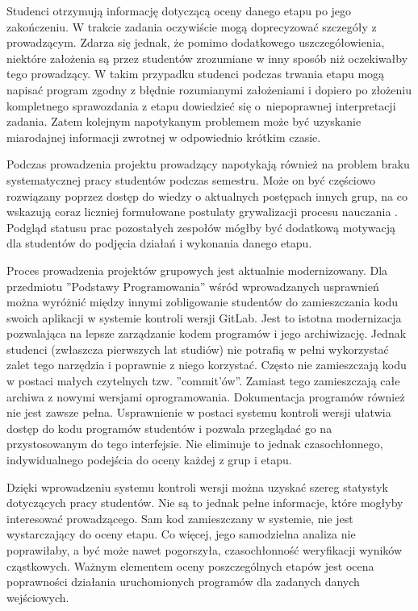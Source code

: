 Studenci otrzymują informację dotyczącą oceny danego etapu po jego zakończeniu.
W trakcie zadania oczywiście mogą doprecyzować szczegóły z prowadzącym.
Zdarza się jednak, że pomimo dodatkowego uszczegółowienia, niektóre założenia są przez studentów zrozumiane w inny sposób niż oczekiwałby tego prowadzący.
W takim przypadku studenci podczas trwania etapu mogą napisać program zgodny z błędnie rozumianymi założeniami i dopiero po złożeniu kompletnego sprawozdania z etapu dowiedzieć się o~niepoprawnej interpretacji zadania.
Zatem kolejnym napotykanym problemem może być uzyskanie miarodajnej informacji zwrotnej w odpowiednio krótkim czasie.

Podczas prowadzenia projektu prowadzący napotykają również na problem braku systematycznej pracy studentów podczas semestru.
Może on być częściowo rozwiązany poprzez dostęp do wiedzy o aktualnych postępach innych grup, na co wskazują coraz liczniej formułowane postulaty grywalizacji procesu nauczania \cite{gamification}.
Podgląd statusu prac pozostałych zespołów mógłby być dodatkową motywacją dla studentów do podjęcia działań i wykonania danego etapu.

Proces prowadzenia projektów grupowych jest aktualnie modernizowany.
Dla przedmiotu ”Podstawy Programowania” wśród wprowadzanych usprawnień można wyróżnić między innymi zobligowanie studentów do zamieszczania kodu swoich aplikacji w systemie kontroli wersji GitLab.
Jest to istotna modernizacja pozwalająca na lepsze zarządzanie kodem programów i jego archiwizację.
Jednak studenci (zwłaszcza pierwszych lat studiów) nie potrafią w pełni wykorzystać zalet tego narzędzia i poprawnie z niego korzystać.
Często nie zamieszczają kodu w postaci małych czytelnych tzw. ”commit'ów”.
Zamiast tego zamieszczają całe archiwa z nowymi wersjami oprogramowania.
Dokumentacja programów również nie jest zawsze pełna.
Usprawnienie w postaci systemu kontroli wersji ułatwia dostęp do kodu programów studentów i pozwala przeglądać go na przystosowanym do tego interfejsie.
Nie eliminuje to jednak czasochłonnego, indywidualnego podejścia do oceny każdej z grup i etapu.

Dzięki wprowadzeniu systemu kontroli wersji można uzyskać szereg statystyk dotyczących pracy studentów.
Nie są to jednak pełne informacje, które mogłyby interesować prowadzącego.
Sam kod zamieszczany w systemie, nie jest wystarczający do oceny etapu.
Co więcej, jego samodzielna analiza nie poprawiłaby, a być może nawet pogorszyła, czasochłonność weryfikacji wyników cząstkowych.
Ważnym elementem oceny poszczególnych etapów jest ocena poprawności działania uruchomionych programów dla zadanych danych wejściowych.

